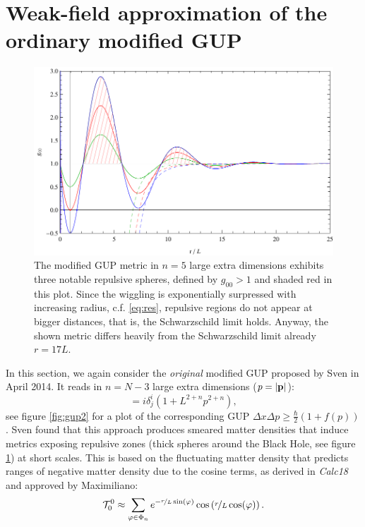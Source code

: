 \documentclass[10pt,a4paper]{article}
\begin{document}
\section{Weak-field approximation of the ordinary modified GUP}\label{sec:2}
\begin{figure}
\includegraphics[scale=1]{figures/g00-GUP-n5.pdf}
\caption{The modified GUP metric in $n=5$ large extra dimensions exhibits three notable repulsive spheres, defined by $g_{00}>1$ and shaded red in this plot. Since the wiggling is exponentially surpressed with increasing radius, c.f. \eqref{eq:res}, repulsive regions do not appear at bigger distances, that is, the Schwarzschild limit holds. Anyway, the shown metric differs heavily from the Schwarzschild limit already $r=17L$.}\label{fig:mod-GUP}
\end{figure}
In this section, we again consider the \emph{original} modified GUP proposed by Sven in April 2014. It reads  in $n=N-3$ large extra dimensions ($p=|\mathbf{ p }|$):
%
\begin{equation}
[x^i, p_j] = i \delta^i_j (1 + L^{2+n} p^{2+n}),
\end{equation}
%
see figure \ref{fig:gup2} for a plot of the corresponding GUP $\Delta x \Delta p \geq \frac{\hbar}{2}(1+f(p))$. Sven found that this approach produces smeared matter densities that induce metrics exposing repulsive zones (thick spheres around the Black Hole, see figure \ref{fig:mod-GUP}) at short scales. This is based on the fluctuating matter density that predicts ranges of negative matter density due to the cosine terms, as derived in \emph{Calc18} and approved by Maximiliano:
\begin{equation} \label{eq:res}
{\cal T}^0_0 \approx 
\sum_{\varphi \in \Phi_n} e^{-\nicefrac rL \sin(\varphi)} \cos\left( \nicefrac rL \cos(\varphi) \right).
\end{equation}
\end{document}
